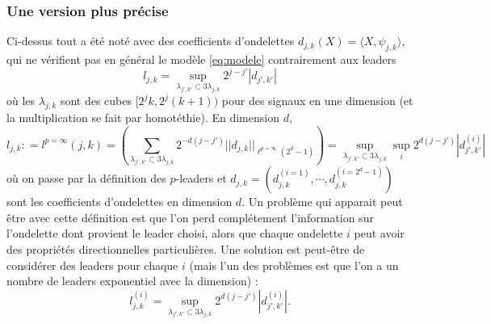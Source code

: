 \documentclass[11pt]{article} %
\begin{document}
\subsubsection{Une version plus précise}
	Ci-dessus tout a été noté avec des coefficients d'ondelettes $d_{j,k}(X) = \langle X,\psi_{j,k}\rangle$, qui ne vérifient pas en général le modèle \ref{eq:modele} contrairement aux leaders
\begin{equation}
	l_{j,k} = \sup_{\lambda_{j',k'}\subset 3\lambda_{j,k}} 2^{j-j'}|d_{j',k'}|
\end{equation}
où les $\lambda_{j,k}$ sont des cubes $[2^jk, 2^j(k+1))$ pour des signaux en une dimension (et la multiplication se fait par homotéthie). En dimension $d$,
\begin{equation}
	l_{j,k} : = l^{p=\infty}(j,k) = \left( \sum_{\lambda_{j',k'}\subset 3\lambda_{j,k} } 2^{-d(j-j') }||d_{j,k}||_{\ell^{p=\infty}(2^d-1)} \right) = \sup_{\lambda_{j', k'}\subset 3\lambda_{j,k}} \sup_i 2^{d(j-j')}| d^{(i)}_{j',k'}|
\end{equation}
où on passe par la définition des $p$-leaders et $d_{j,k} =(d_{j,k}^{(i=1)},\cdots, d_{j,k}^{(i=2^d-1)})$ sont les coefficients d'ondelettes en dimension $d$.
\newline
Un problème qui apparait peut être avec cette définition est que l'on perd complétement l'information sur l'ondelette dont provient le leader choisi, alors que chaque ondelette $i$ peut avoir des propriétés directionnelles particulières. Une solution est peut-être de considérer des leaders pour chaque $i$ (mais l'un des problèmes est que l'on a un nombre de leaders exponentiel avec la dimension) :
\begin{equation}
	l_{j,k}^{(i)} = \sup_{\lambda_{j',k'}\subset 3\lambda_{j,k}} 2^{d(j-j')}|d_{j',k'}^{(i)}|.
\end{equation}
\end{document}
